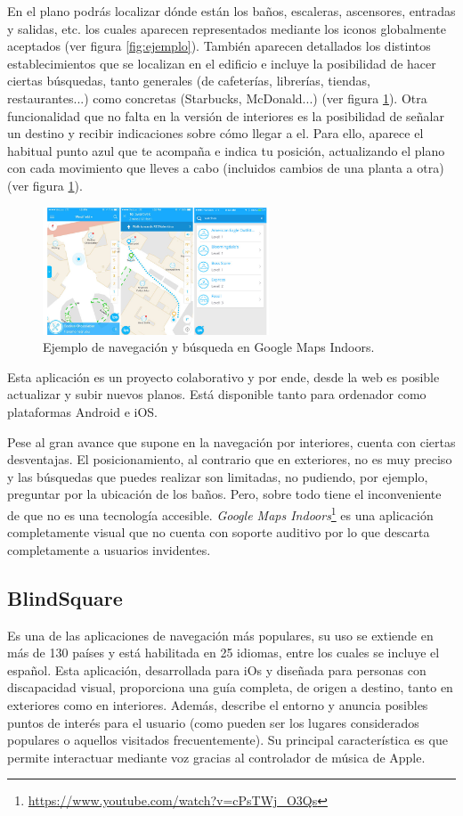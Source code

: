 \documentclass{article}
\begin{document}
		En el plano podrás localizar dónde están los baños, escaleras, ascensores, entradas y salidas, etc. los cuales aparecen representados mediante los iconos globalmente aceptados (ver figura \ref{fig:ejemplo}). También aparecen detallados los distintos establecimientos que se localizan en el edificio e incluye la posibilidad de hacer ciertas búsquedas, tanto generales (de cafeterías, librerías, tiendas, restaurantes...) como concretas (Starbucks, McDonald...) (ver figura \ref{fig:ejemplo3}). Otra funcionalidad que no falta en la versión de interiores es la posibilidad de señalar un destino y recibir indicaciones sobre cómo llegar a el. Para ello, aparece el habitual punto azul que te acompaña e indica tu posición, actualizando el plano con cada movimiento que lleves a cabo (incluidos cambios de una planta a otra) (ver figura \ref{fig:ejemplo3}).
		
		 \begin{figure}[t]
			\centering
			\includegraphics[width=0.6\textwidth]{GMapsInd}
			\caption{Ejemplo de navegación y búsqueda en Google Maps Indoors. }
			\label{fig:ejemplo3}
		\end{figure}
		Esta aplicación es un proyecto colaborativo y por ende, desde la web es posible actualizar y subir nuevos planos. Está disponible tanto para ordenador como plataformas Android e iOS.
	
		Pese al gran avance que supone en la navegación por interiores, cuenta con ciertas desventajas. El posicionamiento, al contrario que en exteriores, no es muy preciso y las búsquedas que puedes realizar son limitadas, no pudiendo, por ejemplo, preguntar por la ubicación de los baños. Pero, sobre todo tiene el inconveniente de que no es una tecnología accesible. \textit{Google Maps Indoors}\footnote{\url{https://www.youtube.com/watch?v=cPsTWj_O3Qs}} es una aplicación completamente visual que no cuenta con soporte auditivo por lo que descarta completamente a usuarios invidentes.
	
		
	\subsection{BlindSquare}
	    Es una de las aplicaciones de navegación más populares, su uso se extiende en más de 130 países y está habilitada en 25 idiomas, entre los cuales se incluye el español. Esta aplicación, desarrollada para iOs y diseñada para personas con discapacidad visual, proporciona una guía completa, de origen a destino, tanto en exteriores como en interiores. Además, describe el entorno y anuncia posibles puntos de interés para el usuario (como pueden ser los lugares considerados populares o aquellos visitados frecuentemente). Su principal característica es que permite interactuar mediante voz gracias al controlador de música de Apple. 
	
\end{document}
